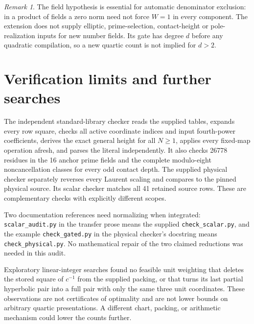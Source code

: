 \documentclass[11pt]{article}
\theoremstyle{remark}\newtheorem{remark}[theorem]{Remark}
\begin{document}
\begin{remark}
The field hypothesis is essential for automatic denominator exclusion:
in a product of fields a zero norm need not force $W=1$ in every
component. The extension does not supply elliptic, prime-selection,
contact-height or pole-realization inputs for new number fields. Its
gate has degree $d$ before any quadratic compilation, so a new
quartic count is not implied for $d>2$.
\end{remark}

\section{Verification limits and further searches}
The independent standard-library checker reads the supplied tables,
expands every row square, checks all active coordinate indices and
input fourth-power coefficients, derives the exact general height
for all $N\ge1$, applies every fixed-map operation afresh, and parses
the literal independently. It also checks 26778 residues in the 16
anchor prime fields and the complete modulo-eight noncancellation
classes for every odd contact depth. The supplied physical checker
separately reverses every Laurent scaling and compares to the pinned
physical source. Its scalar checker matches all 41 retained source
rows. These are complementary checks with explicitly different scopes.

Two documentation references need normalizing when integrated:
\texttt{scalar\_audit.py} in the transfer prose means the supplied
\texttt{check\_scalar.py}, and the example \texttt{check\_gated.py} in
the physical checker's docstring means \texttt{check\_physical.py}.
No mathematical repair of the two claimed reductions was needed in
this audit.

Exploratory linear-integer searches found no feasible unit weighting
that deletes the stored square of $c^{-1}$ from the supplied packing,
or that turns its last partial hyperbolic pair into a full pair with
only the same three unit coordinates. These observations are not
certificates of optimality and are not lower bounds on arbitrary
quartic presentations. A different chart, packing, or arithmetic
mechanism could lower the counts further.
\end{document}
